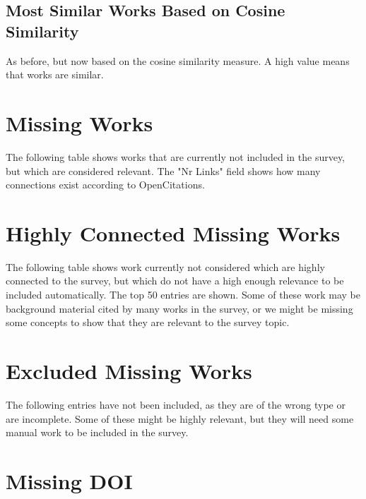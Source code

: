 \documentclass[a4paper]{article}
\begin{document}




\clearpage
\subsection{Most Similar Works Based on Cosine Similarity}
As before, but now based on the cosine similarity measure. A high value means that works are similar.





\clearpage
\section{Missing Works}

The following table shows works that are currently not included in the survey, but which are considered relevant. The "Nr Links" field shows how many connections exist according to OpenCitations.



\clearpage
\section{Highly Connected Missing Works}

The following table shows work currently not considered which are highly connected to the survey, but which do not have a high enough relevance to be included automatically. The top 50 entries are shown. Some of these work may be background material cited by many works in the survey, or we might be missing some concepts to show that they are relevant to the survey topic.



\clearpage
\section{Excluded Missing Works}

The following entries have not been included, as they are of the wrong type or are incomplete. Some of these might be highly relevant, but they will need some manual work to be included in the survey.



\clearpage
\section{Missing DOI}
\end{document}
